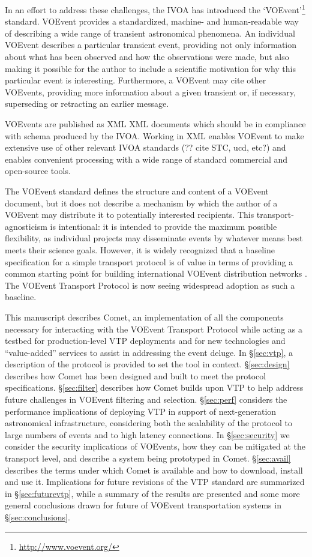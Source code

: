 \documentclass[5p,authoryear]{elsarticle}
\begin{document}
In an effort to address these challenges, the IVOA has introduced the
`VOEvent'\footnote{\url{http://www.voevent.org/}} \citep{Seaman:2011}
standard. VOEvent provides a standardized, machine- and human-readable way of
describing a wide range of transient astronomical phenomena. An individual
VOEvent describes a particular transient event, providing not only information
about what has been observed and how the observations were made, but also
making it possible for the author to include a scientific motivation for why
this particular event is interesting. Furthermore, a VOEvent may cite other
VOEvents, providing more information about a given transient or, if necessary,
superseding or retracting an earlier message.

VOEvents are published as XML \citep{Bray:2008} XML documents which should be
in compliance with schema \citep{Gau:2012, Peterson:2012} produced by the
IVOA. Working in XML enables VOEvent to make extensive use of other relevant
IVOA standards (?? cite STC, ucd, etc?) and enables convenient processing with
a wide range of standard commercial and open-source tools.

The VOEvent standard defines the structure and content of a VOEvent document,
but it does not describe a mechanism by which the author of a VOEvent may
distribute it to potentially interested recipients. This transport-agnosticism
is intentional: it is intended to provide the maximum possible flexibility, as
individual projects may disseminate events by whatever means best meets their
science goals. However, it is widely recognized that a baseline specification
for a simple transport protocol is of value in terms of providing a common
starting point for building international VOEvent distribution networks
\citep{Williams:2012}. The VOEvent Transport Protocol
\citep[VTP;][]{Allan:2009} is now seeing widespread adoption as such a
baseline.

This manuscript describes Comet, an implementation of all the components
necessary for interacting with the VOEvent Transport Protocol while acting as
a testbed for production-level VTP deployments and for new technologies and
``value-added'' services to assist in addressing the event deluge.  In
\S\ref{sec:vtp}, a description of the protocol is provided to set the tool in
context. \S\ref{sec:design} describes how Comet has been designed and built to
meet the protocol specifications. \S\ref{sec:filter} describes how Comet
builds upon VTP to help address future challenges in VOEvent filtering and
selection. \S\ref{sec:perf} considers the performance implications of
deploying VTP in support of next-generation astronomical infrastructure,
considering both the scalability of the protocol to large numbers of events
and to high latency connections. In \S\ref{sec:security} we consider the
security implications of VOEvents, how they can be mitigated at the transport
level, and describe a system being prototyped in Comet. \S\ref{sec:avail}
describes the terms under which Comet is available and how to download,
install and use it. Implications for future revisions of the VTP standard are
summarized in \S\ref{sec:futurevtp}, while a summary of the results are
presented and some more general conclusions drawn for future of VOEvent
transportation systems in \S\ref{sec:conclusions}.
\end{document}
